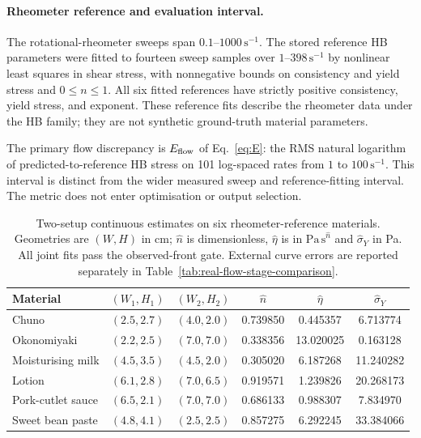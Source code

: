 \paragraph{Rheometer reference and evaluation interval.}
The rotational-rheometer sweeps span $0.1$--$1000\,\mathrm{s}^{-1}$.
The stored reference HB parameters were fitted to fourteen sweep samples
over $1$--$398\,\mathrm{s}^{-1}$ by nonlinear least squares in shear
stress, with nonnegative bounds on consistency and yield stress and
$0\leq n\leq1$. All six fitted references have strictly positive
consistency, yield stress, and exponent.
These reference fits describe the rheometer data under the HB family;
they are not synthetic ground-truth material parameters.

The primary flow discrepancy is $E_{\rm flow}$ of Eq.~\eqref{eq:E}:
the RMS natural logarithm of predicted-to-reference HB stress on 101
log-spaced rates from $1$ to $100\,\mathrm{s}^{-1}$. This interval is
distinct from the wider measured sweep and reference-fitting interval.
The metric does not enter optimisation or output selection.

\begin{table}[!htbp]
\centering\footnotesize
\setlength{\tabcolsep}{5pt}
\caption{Two-setup continuous estimates on six rheometer-reference materials. Geometries are $(W,H)$ in cm; $\hat n$ is dimensionless, $\hat\eta$ is in $\mathrm{Pa\,s}^{\hat n}$ and $\hat\sigma_Y$ in Pa. All joint fits pass the observed-front gate. External curve errors are reported separately in Table~\ref{tab:real-flow-stage-comparison}.}
\label{tab:rheo-recovery}
\begin{tabular}{@{}lccccc@{}}
\toprule
Material & $(W_1,H_1)$ & $(W_2,H_2)$ & $\hat n$
 & $\hat\eta$ & $\hat\sigma_Y$ \\
\midrule
Chuno & $(2.5,2.7)$ & $(4.0,2.0)$ & 0.739850 & 0.445357 & 6.713774 \\
Okonomiyaki & $(2.2,2.5)$ & $(7.0,7.0)$ & 0.338356 & 13.020025 & 0.163128 \\
Moisturising milk & $(4.5,3.5)$ & $(4.5,2.0)$ & 0.305020 & 6.187268 & 11.240282 \\
Lotion & $(6.1,2.8)$ & $(7.0,6.5)$ & 0.919571 & 1.239826 & 20.268173 \\
Pork-cutlet sauce & $(6.5,2.1)$ & $(7.0,7.0)$ & 0.686133 & 0.988307 & 7.834970 \\
Sweet bean paste & $(4.8,4.1)$ & $(2.5,2.5)$ & 0.857275 & 6.292245 & 33.384066 \\
\bottomrule
\end{tabular}
\end{table}

